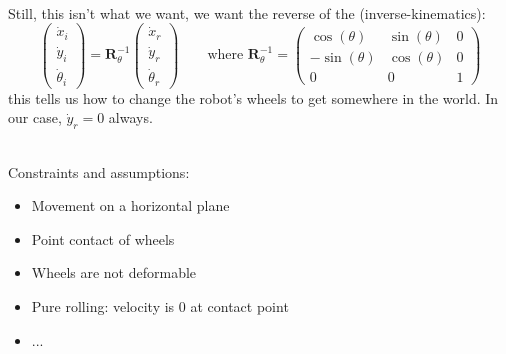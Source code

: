 \documentclass[13pt]{article}
\begin{document}
\hfill \\
\noindent
Still, this isn't what we want, we want the reverse of the (inverse-kinematics):
\begin{equation}
	\begin{pmatrix} \dot x_{i} \\ \dot y_{i} \\ \dot \theta_{i} \end{pmatrix} =
	\bm{R}_{\theta}^{-1} \begin{pmatrix} \dot x_{r} \\ \dot y_{r} \\ \dot \theta_{r} \end{pmatrix} \qquad
	\text{where }
	\bm{R}_{\theta}^{-1} = \begin{pmatrix} \cos(\theta) & \sin(\theta) & 0 \\ - \sin(\theta) & \cos(\theta) & 0 \\ 0 & 0 & 1 \end{pmatrix}
\end{equation}
this tells us how to change the robot's wheels to get somewhere in the world. In our case, $\dot y_{r} = 0$ always.

\hfill \\
\noindent
Constraints and assumptions:
\begin{itemize}
	\item Movement on a horizontal plane
	\item Point contact of wheels
	\item Wheels are not deformable
	\item Pure rolling: velocity is 0 at contact point
	\item ...
\end{itemize}
\end{document}
